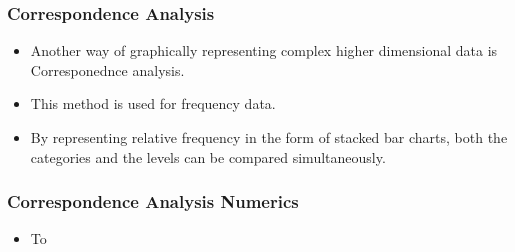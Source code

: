 \documentclass{beamer}
\begin{document}
\begin{frame}
\frametitle{Correspondence Analysis}
\begin{itemize}
\item Another way of graphically representing complex higher dimensional data is Corresponednce analysis.
\item This method is used for frequency data.
\item By representing relative frequency in the form of stacked bar charts, both the categories and the levels can be compared simultaneously.
\end{itemize}
\end{frame}

\begin{frame}
\frametitle{Correspondence Analysis Numerics}
\begin{itemize}
\item To 
\end{itemize}
\end{frame}
\end{document}
